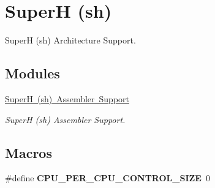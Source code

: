 \hypertarget{group__RTEMSScoreCPUsh}{}\section{SuperH (sh)}
\label{group__RTEMSScoreCPUsh}


SuperH (sh) Architecture Support.  


\subsection*{Modules}
\begin{DoxyCompactItemize}
\item 
\mbox{\hyperlink{group__RTEMSScoreCPUshASM}{Super\+H (sh) Assembler Support}}
\begin{DoxyCompactList}\small\item\em SuperH (sh) Assembler Support. \end{DoxyCompactList}\end{DoxyCompactItemize}
\subsection*{Macros}
\begin{DoxyCompactItemize}
\item 
\mbox{\label{group__RTEMSScoreCPUsh_gaf8e38596ad3db49995fd8eb9fb4e86b2}} 
\#define {\bfseries C\+P\+U\+\_\+\+P\+E\+R\+\_\+\+C\+P\+U\+\_\+\+C\+O\+N\+T\+R\+O\+L\+\_\+\+S\+I\+ZE}~0
\end{DoxyCompactItemize}
